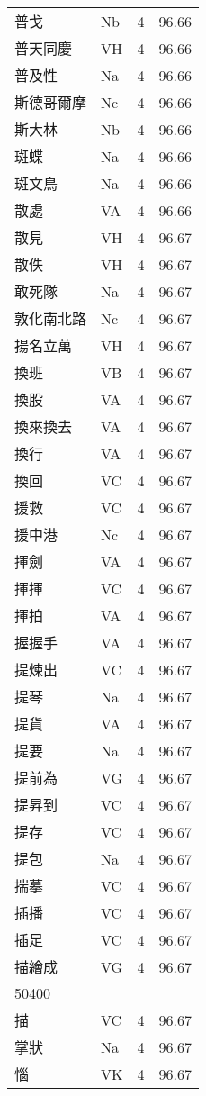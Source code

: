 \documentclass[twocolumn]{book}
\begin{document}
\begin{supertabular}{llrr}
普戈 & Nb & 4 &  96.66\\
普天同慶 & VH & 4 &  96.66\\
普及性 & Na & 4 &  96.66\\
斯德哥爾摩 & Nc & 4 &  96.66\\
斯大林 & Nb & 4 &  96.66\\
斑蝶 & Na & 4 &  96.66\\
斑文鳥 & Na & 4 &  96.66\\
散處 & VA & 4 &  96.66\\
散見 & VH & 4 &  96.67\\
散佚 & VH & 4 &  96.67\\
敢死隊 & Na & 4 &  96.67\\
敦化南北路 & Nc & 4 &  96.67\\
揚名立萬 & VH & 4 &  96.67\\
換班 & VB & 4 &  96.67\\
換股 & VA & 4 &  96.67\\
換來換去 & VA & 4 &  96.67\\
換行 & VA & 4 &  96.67\\
換回 & VC & 4 &  96.67\\
援救 & VC & 4 &  96.67\\
援中港 & Nc & 4 &  96.67\\
揮劍 & VA & 4 &  96.67\\
揮揮 & VC & 4 &  96.67\\
揮拍 & VA & 4 &  96.67\\
握握手 & VA & 4 &  96.67\\
提煉出 & VC & 4 &  96.67\\
提琴 & Na & 4 &  96.67\\
提貨 & VA & 4 &  96.67\\
提要 & Na & 4 &  96.67\\
提前為 & VG & 4 &  96.67\\
提昇到 & VC & 4 &  96.67\\
提存 & VC & 4 &  96.67\\
提包 & Na & 4 &  96.67\\
揣摹 & VC & 4 &  96.67\\
插播 & VC & 4 &  96.67\\
插足 & VC & 4 &  96.67\\
描繪成 & VG & 4 &  96.67\\
50400\\
描 & VC & 4 &  96.67\\
掌狀 & Na & 4 &  96.67\\
惱 & VK & 4 &  96.67\\

\end{supertabular}
\end{document}
